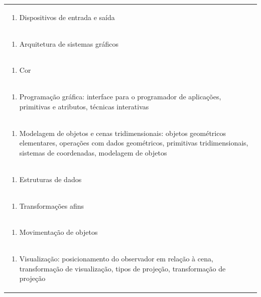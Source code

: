 \documentclass[11pt]{article}
\begin{document}
\begin{center}
\begin{longtable}{|p{4cm}|p{4cm}|p{4cm}|p{4cm}|}
\multicolumn{4}{|p{\dimexpr 16cm + 6\tabcolsep\relax}|}{\begin{enumerate}[start=2]\item Dispositivos de entrada e saída\end{enumerate}}\\
\multicolumn{4}{|p{\dimexpr 16cm + 6\tabcolsep\relax}|}{\begin{enumerate}[start=3]\item Arquitetura de sistemas gráficos\end{enumerate}}\\
\multicolumn{4}{|p{\dimexpr 16cm + 6\tabcolsep\relax}|}{\begin{enumerate}[start=4]\item Cor\end{enumerate}}\\
\multicolumn{4}{|p{\dimexpr 16cm + 6\tabcolsep\relax}|}{\begin{enumerate}[start=5]\item Programação gráfica: interface para o programador de aplicações, primitivas e atributos, técnicas interativas\end{enumerate}}\\
\multicolumn{4}{|p{\dimexpr 16cm + 6\tabcolsep\relax}|}{\begin{enumerate}[start=6]\item Modelagem de objetos e cenas tridimensionais: objetos geométricos elementares, operações com dados geométricos, primitivas tridimensionais, sistemas de coordenadas, modelagem de objetos\end{enumerate}}\\
\multicolumn{4}{|p{\dimexpr 16cm + 6\tabcolsep\relax}|}{\begin{enumerate}[start=7]\item Estruturas de dados\end{enumerate}}\\
\multicolumn{4}{|p{\dimexpr 16cm + 6\tabcolsep\relax}|}{\begin{enumerate}[start=8]\item Transformações afins\end{enumerate}}\\
\multicolumn{4}{|p{\dimexpr 16cm + 6\tabcolsep\relax}|}{\begin{enumerate}[start=9]\item Movimentação de objetos\end{enumerate}}\\
\multicolumn{4}{|p{\dimexpr 16cm + 6\tabcolsep\relax}|}{\begin{enumerate}[start=10]\item Visualização: posicionamento do observador em relação à cena, transformação de visualização, tipos de projeção, transformação de projeção\end{enumerate}}\\

\end{longtable}
\end{center}
\end{document}
